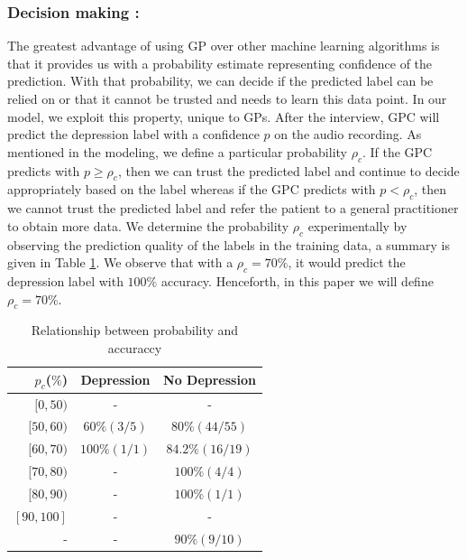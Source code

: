 \documentclass{article}
\begin{document}
	\subsubsection{Decision making :}
The greatest advantage of using GP over other machine learning algorithms is that it provides us with a probability estimate representing confidence of the prediction. 
    With that probability, we can decide if the predicted label can be relied on or that it cannot be trusted and needs to learn this data point. 
    In our model, we exploit this property, unique to GPs. 
    After the interview, GPC will predict the depression label with a confidence $p$ on the audio recording. 
    As mentioned in the modeling, we define a particular probability $\rho_c$. 
    If the GPC predicts with $p \geq \rho_c$, then we can trust the predicted label and continue to decide appropriately based on the label whereas if the GPC predicts with $p < \rho_c$, then we cannot trust the predicted label and refer the patient to a general practitioner to obtain more data.
    We determine the probability $\rho_c$ experimentally by observing the prediction quality of the labels in the training data, a summary is given in Table \ref{tab:rho}. We observe that with a $\rho_c = 70\%$, it would predict the depression label with $100\%$ accuracy. 
    Henceforth, in this paper we will define $\rho_c = 70\%$.
	
 	\begin{table}[h]
 		\begin{center}
  			\begin{tabular}{ | r | c | c | }
    			\hline
			 	 \bfseries $p_c$($\%$)	& \bfseries Depression 	& \bfseries No Depression \\ \hline
				 $[0,50)$		& - 				& - 			 			\\ \hline
				 $[50,60)$		& $60\%(3/5)$ 	& $80\%(44/55)$ 	 	\\ \hline 
				 $[60,70)$		& $100\%(1/1)$ & $84.2\%(16/19)$ 	\\ \hline
				 $[70,80)$		& - 				& $100\%(4/4)$		 	\\ \hline
				 $[80,90)$		& - 				& $100\%(1/1)$ 	 	\\ \hline 
				 $[90,100]$		& - 				& - 			 			\\ \hline
				 -					& - 				& $90\%(9/10)$ 		\\ \hline
			 \end{tabular}
		\end{center}
 	\caption{Relationship between probability and accuraccy}
 	\label{tab:rho}
 	\end{table}
\end{document}
